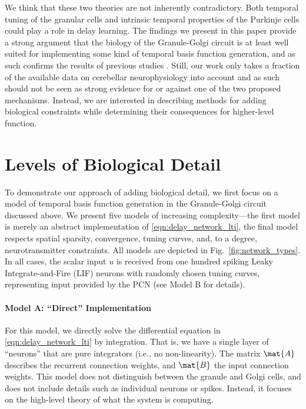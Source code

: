We think that these two theories are not inherently contradictory. Both temporal tuning of the granular cells and intrinsic temporal properties of the Purkinje cells could play a role in delay learning.
The findings we present in this paper provide a strong argument that the biology of the Granule-Golgi circuit is at least well suited for implementing some kind of temporal basis function generation, and as such confirms the results of previous studies  \citep[cf.][]{dean2010cerebellar,rossert2015edge}.
Still, our work only takes a fraction of the available data on cerebellar neurophysiology into account and as such should not be seen as strong evidence for or against one of the two proposed mechanisms.
Instead, we are interested in describing methods for adding biological constraints while determining their consequences for higher-level function.

\section{Levels of Biological Detail}

To demonstrate our approach of adding biological detail, we first focus on a model of temporal basis function generation in the Granule-Golgi circuit discussed above.
We present five models of increasing complexity---the first model is merely an abstract implementation of \cref{eqn:delay_network_lti}, the final model respects spatial sparsity, convergence, tuning curves, and, to a degree, neurotransmitter constraints.
All models are depicted in Fig.~\ref{fig:network_types}.
In all cases, the scalar input $u$ is received from one hundred spiking Leaky Integrate-and-Fire (LIF) neurons with randomly chosen tuning curves, representing input provided by the PCN (see Model B for details).

\paragraph{Model A: \enquote{Direct} Implementation} 
For this model, we directly solve the differential equation in \cref{eqn:delay_network_lti} by integration.
That is, we have a single layer of \enquote{neurons} that are pure integrators (i.e., no non-linearity). The matrix $\mat{A}$ describes the recurrent connection weights, and $\mat{B}$ the input connection weights.
This model does not distinguish between the granule and Golgi cells, and does not include details such as individual neurons or spikes.
Instead, it focuses on the high-level theory of what the system is computing.


